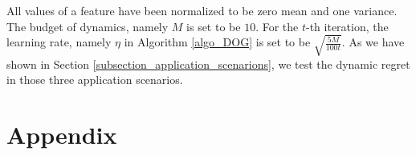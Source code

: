 \documentclass{article}
\begin{document}
All values of a feature have been normalized to be zero mean and one variance. The budget of dynamics, namely $M$ is set to be $10$. For the $t$-th iteration, the learning rate, namely $\eta$ in Algorithm \ref{algo_DOG} is set to be $\sqrt{\frac{5M}{100t}}$.  As we have shown in Section \ref{subsection_application_scenarions}, we test the dynamic regret in those three application scenarios.  






















\newpage



\section*{Appendix}
\end{document}
